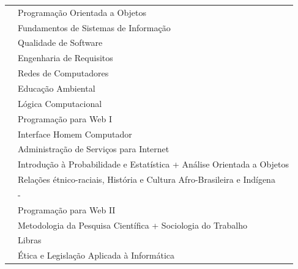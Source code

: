 \documentclass[11pt,fleqn]{book} %
\begin{document}
\begin{table}[]
{\begin{tabular}{@{}l|l@{}}
			\nameref{3_poo}                 & Programação Orientada a Objetos                                           \\
			\nameref{3_nosql}               & Fundamentos de Sistemas de Informação                                     \\			
			\nameref{3_testsoft}            & Qualidade de Software                                                     \\
			\nameref{3_engreq}              & Engenharia de Requisitos                                                  \\
			\nameref{3_redescomp}           & Redes de Computadores                                                     \\
			\nameref{3_educamb}             & Educação Ambiental                                                        \\
			\nameref{3_projamb}             & Lógica Computacional                                                      \\ \midrule
			\nameref{4_ppw1}                & Programação para Web I                                                    \\
			\nameref{4_ihc}                 & Interface Homem Computador                                                \\
			\nameref{4_asi}                 & Administração de Serviços para Internet                                   \\
			\nameref{4_probest}             & Introdução à Probabilidade e Estatística + Análise Orientada a Objetos    \\
			\nameref{4_etnicoraciais}       & Relações étnico-raciais, História e Cultura Afro-Brasileira e Indígena    \\
			\nameref{4_projsoc}             & -                                                                         \\ \midrule			
			\nameref{5_ppw2}                & Programação para Web II                                                   \\
			\nameref{5_metodologia}         & Metodologia da Pesquisa Científica + Sociologia do Trabalho               \\
			\nameref{5_libras}              & Libras                                                                    \\
			\nameref{5_etica}               & Ética e Legislação Aplicada à Informática                                 \\

\end{tabular}}
\end{table}
\end{document}
